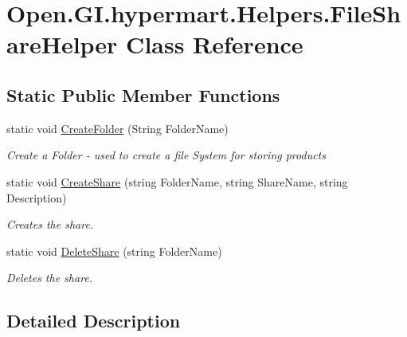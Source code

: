 \hypertarget{class_open_1_1_g_i_1_1hypermart_1_1_helpers_1_1_file_share_helper}{}\section{Open.\+G\+I.\+hypermart.\+Helpers.\+File\+Share\+Helper Class Reference}
\label{class_open_1_1_g_i_1_1hypermart_1_1_helpers_1_1_file_share_helper}


 


\subsection*{Static Public Member Functions}
\begin{DoxyCompactItemize}
\item 
static void \hyperlink{class_open_1_1_g_i_1_1hypermart_1_1_helpers_1_1_file_share_helper_a8e938d7ae2d931ab892c0ebf964ee4d2}{Create\+Folder} (String Folder\+Name)
\begin{DoxyCompactList}\small\item\em Create a Folder -\/ used to create a file System for storing products \end{DoxyCompactList}\item 
static void \hyperlink{class_open_1_1_g_i_1_1hypermart_1_1_helpers_1_1_file_share_helper_af08f7c0abe722a41623b0ae56f78a927}{Create\+Share} (string Folder\+Name, string Share\+Name, string Description)
\begin{DoxyCompactList}\small\item\em Creates the share. \end{DoxyCompactList}\item 
static void \hyperlink{class_open_1_1_g_i_1_1hypermart_1_1_helpers_1_1_file_share_helper_afa333f49f2689e9a64708c27450582ef}{Delete\+Share} (string Folder\+Name)
\begin{DoxyCompactList}\small\item\em Deletes the share. \end{DoxyCompactList}\end{DoxyCompactItemize}


\subsection{Detailed Description}




